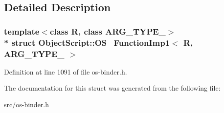 \subsection{Detailed Description}
\subsubsection*{template$<$class R, class A\+R\+G\+\_\+\+T\+Y\+P\+E\+\_$>$\\*
struct Object\+Script\+::\+O\+S\+\_\+\+Function\+Imp1$<$ R, A\+R\+G\+\_\+\+T\+Y\+P\+E\+\_ $>$}



Definition at line 1091 of file os-\/binder.\+h.



The documentation for this struct was generated from the following file\+:\begin{DoxyCompactItemize}
\item 
src/os-\/binder.\+h\end{DoxyCompactItemize}
